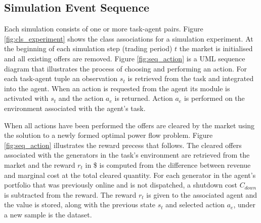

\subsection{Simulation Event Sequence}
Each simulation consists of one or more task-agent pairs.  Figure
\ref{fig:cls_experiment} shows the class associations for a simulation
experiment.  At the beginning of each simulation step (trading period) $t$ the
market is initialised and all existing offers are removed.  Figure
\ref{fig:seq_action} is a UML sequence diagram that illustrates the process of
choosing and performing an action.  For each task-agent tuple an observation
$s_t$ is retrieved from the task and integrated into the agent.  When an action
is requested from the agent its module is activated with $s_t$ and the action
$a_e$ is returned.  Action $a_e$ is performed on the environment associated with
the agent's task.


When all actions have been performed the offers are cleared by the market using
the solution to a newly formed optimal power flow problem.  Figure
\ref{fig:seq_action} illustrates the reward precess that follows.  The cleared offers associated with
the generators in the task's environment are retrieved from the market and the
reward $r_t$ in \$ is computed from the difference between revenue and marginal
cost at the total cleared quantity.  For each generator in the agent's portfolio
that was previously online and is not dispatched, a shutdown cost $C_{down}$ is
subtracted from the reward.
The reward $r_t$ is given to the associated agent and the value is stored, along
with the previous state $s_t$ and selected action $a_e$, under a new sample is
the dataset.


